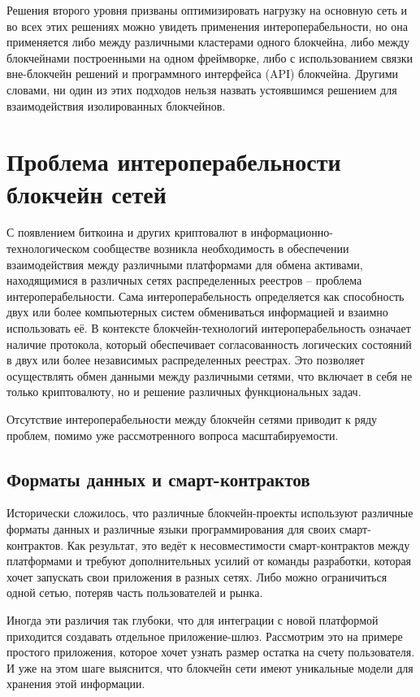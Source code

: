 Решения второго уровня призваны оптимизировать нагрузку на основную сеть и во всех этих решениях можно увидеть применения интероперабельности, но она применяется либо между различными кластерами одного блокчейна, либо между блокчейнами построенными на одном фреймворке, либо с использованием связки вне-блокчейн решений и программного интерфейса (API) блокчейна. Другими словами, ни один из этих подходов нельзя назвать устоявшимся решением для взаимодействия изолированных блокчейнов.

\section{Проблема интероперабельности блокчейн сетей}

С появлением биткоина и других криптовалют в информационно-технологическом сообществе возникла необходимость в обеспечении взаимодействия между различными платформами для обмена активами, находящимися в различных сетях распределенных реестров -- проблема интероперабельности. Сама интероперабельность определяется как способность двух или более компьютерных систем обмениваться информацией и взаимно использовать её\cite{label12}. В контексте блокчейн-технологий интероперабельность означает наличие протокола, который обеспечивает согласованность логических состояний в двух или более независимых распределенных реестрах. Это позволяет осуществлять обмен данными между различными сетями, что включает в себя не только криптовалюту, но и решение различных функциональных задач.

Отсутствие интероперабельности между блокчейн сетями приводит к ряду проблем, помимо уже рассмотренного вопроса масштабируемости.

\subsection{Форматы данных и смарт-контрактов}

Исторически сложилось, что различные блокчейн-проекты используют различные форматы данных и различные языки программирования для своих смарт-контрактов. Как результат, это ведёт к несовместимости смарт-контрактов между платформами и требуют дополнительных усилий от команды разработки, которая хочет запускать свои приложения в разных сетях. Либо можно ограничиться одной сетью, потеряв часть пользователей и рынка.

Иногда эти различия так глубоки, что для интеграции с новой платформой приходится создавать отдельное приложение-шлюз. Рассмотрим это на примере простого приложения, которое хочет узнать размер остатка на счету пользователя. И уже на этом шаге выяснится, что блокчейн сети имеют уникальные модели для хранения этой информации.

